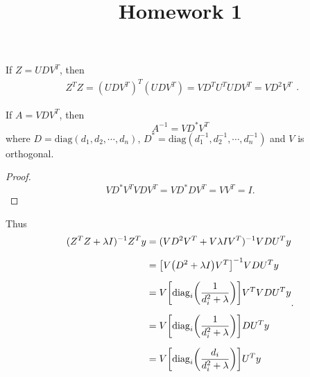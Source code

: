\documentclass{article}
\begin{document}
\title{Homework 1}
\maketitle

\begin{prp}
	If $Z=UDV^T$, then
	\[
		\begin{aligned}
			Z^TZ
			=
			(UDV^T)^T(UDV^T)
			=
			VD^TU^TUDV^T
			=
			VD^2V^T
		\end{aligned}
	.\] 
\end{prp}
\begin{prp}
	If $A=VDV^T$, then \[A^{-1}=VD^*V^T\] where $D=\mathrm{diag}(d_1,d_2,\cdots,d_n)$, $D^*=\mathrm{diag}(d_1^{-1},d_2^{-1},\cdots,d_n^{-1})$ and $V$ is orthogonal.
\end{prp}
\begin{proof}
	\[VD^*V^TVDV^T=VD^*DV^T=VV^T=I.\]
\end{proof}

Thus
\[
	\begin{aligned}
		(Z^TZ+\lambda I)^{-1}Z^Ty
		&=
		(VD^2V^T+V\lambda IV^T)^{-1}VDU^Ty
		\\[6pt]&=
		\qty[V\qty(D^2+\lambda I)V^T]^{-1}VDU^Ty
		\\[6pt]&=
		V\qty[\mathrm{diag}_i\qty(\frac{1}{d_i^2+\lambda})]V^TVDU^Ty
		\\[6pt]&=
		V\qty[\mathrm{diag}_i\qty(\frac{1}{d_i^2+\lambda})]DU^Ty
		\\[6pt]&=
		V\qty[\mathrm{diag}_i\qty(\frac{d_i}{d_i^2+\lambda})]U^Ty
	\end{aligned}
.\]
\end{document}
